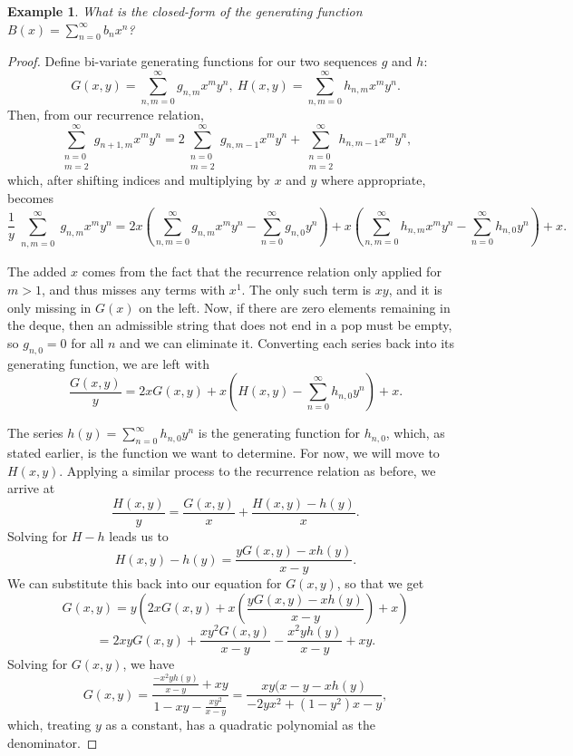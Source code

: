 \documentclass[12pt]{article}
\newtheorem{ex}{Example} %
\begin{document}
\begin{ex}
What is the closed-form of the generating function $B(x)=\sum\limits_{n=0}^\infty b_nx^n$?
\end{ex}
\begin{proof}
Define bi-variate generating functions for our two sequences $g$ and $h$:
$$G(x,y)=\sum\limits_{n,m=0}^\infty g_{n,m}x^my^n,\ H(x,y)=\sum\limits_{n,m=0}^\infty h_{n,m}x^my^n.$$
Then, from our recurrence relation, $$\sum\limits_{\substack{n=0\\m=2}}^\infty g_{n+1,m}x^my^n = 2\sum\limits_{\substack{n=0\\m=2}}^\infty g_{n,m-1}x^my^n+\sum\limits_{\substack{n=0\\m=2}}^\infty h_{n,m-1}x^my^n,$$ which, after shifting indices and multiplying by $x$ and $y$ where appropriate, becomes $$\frac{1}{y}\sum\limits_{\substack{n,m=0}}^\infty g_{n,m}x^my^n = 2x\left(\sum\limits_{n,m=0}^\infty g_{n,m}x^my^n-\sum\limits_{n=0}^\infty g_{n,0}y^n\right)+x\left(\sum\limits_{n,m=0}^\infty h_{n,m}x^my^n-\sum\limits_{n=0}^\infty h_{n,0}y^n\right)+x.$$

The added $x$ comes from the fact that the recurrence relation only applied for $m>1$, and thus misses any terms with $x^1$. The only such term is $xy$, and it is only missing in $G(x)$ on the left. Now, if there are zero elements remaining in the deque, then an admissible string that does not end in a pop must be empty, so $g_{n,0}=0$ for all $n$ and we can eliminate it. Converting each series back into its generating function, we are left with $$\frac{G(x,y)}{y}=2xG(x,y)+x\left(H(x,y)-\sum\limits_{n=0}^\infty h_{n,0}y^n\right)+x.$$ 

The series $h(y)=\sum_{n=0}^\infty h_{n,0}y^n$ is the generating function for $h_{n,0}$, which, as stated earlier, is the function we want to determine. For now, we will move to $H(x,y)$. Applying a similar process to the recurrence relation as before, we arrive at $$\frac{H(x,y)}{y}=\frac{G(x,y)}{x}+\frac{H(x,y)-h(y)}{x}.$$ Solving for $H-h$ leads us to $$H(x,y)-h(y)=\frac{yG(x,y)-xh(y)}{x-y}.$$ We can substitute this back into our equation for $G(x,y)$, so that we get $$G(x,y)=y\left(2xG(x,y) +x\left(\frac{yG(x,y)-xh(y)}{x-y}\right)+x\right)$$ $$=2xyG(x,y)+\frac{xy^2G(x,y)}{x-y}-\frac{x^2yh(y)}{x-y}+xy.$$ Solving for $G(x,y)$, we have $$G(x,y)=\frac{\frac{-x^2yh(y)}{x-y}+xy}{1-xy-\frac{xy^2}{x-y}}=\frac{xy(x-y-xh(y)}{-2yx^2+(1-y^2)x-y},$$ which, treating $y$ as a constant, has a quadratic polynomial as the denominator.


\end{proof}
\end{document}

